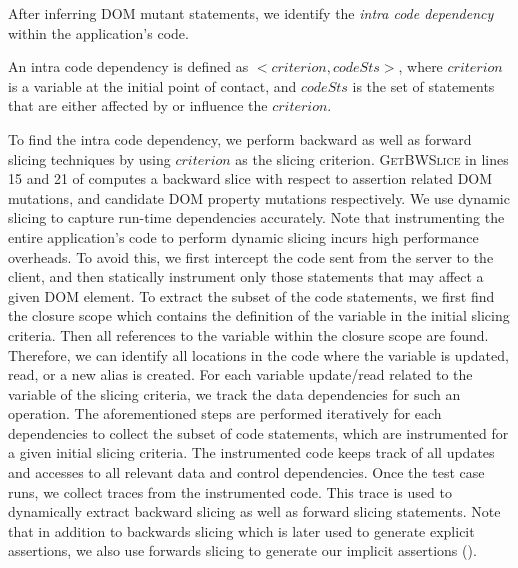 After inferring DOM mutant statements, we identify the \emph{intra code dependency} within the application's code.
\begin{mydef}
\label{def:intraCodeDep}  
An intra code dependency is defined as $<criterion, codeSts>$, where $criterion$ is a variable at the initial point of contact, and $codeSts$ is the set of statements that are either affected by or influence the $criterion$. 
\end{mydef}
To find the intra code dependency, we perform backward as well as forward slicing techniques by using $criterion$ as the slicing criterion.
\textsc{GetBWSlice} in lines  15 and 21 of  computes a backward slice with respect to assertion related DOM mutations, and candidate DOM property mutations respectively.
We use dynamic slicing to capture run-time dependencies accurately.
Note that instrumenting the entire application's code to perform dynamic slicing incurs high performance overheads. To avoid this, we first intercept the code sent from the server to the client, and then statically instrument only those statements that may affect a given DOM element.
To extract the subset of the code statements, we first find the \javascript closure scope which contains the definition of the variable in the initial slicing criteria. Then all references to the variable within the closure scope are found. Therefore, we can identify all locations in the code where the variable is updated, read, or a new alias is created. For each variable update/read related to the variable of the slicing criteria, we track the data dependencies for such an operation. The aforementioned steps are performed iteratively for each dependencies to collect the subset of code statements, which are instrumented for a given initial slicing criteria.
The instrumented code keeps track of all updates and accesses to all relevant data and control dependencies.   
Once the test case runs, we collect traces from the instrumented code. This trace is used to dynamically extract backward slicing as well as forward slicing statements. Note that in addition to backwards slicing which is later used to generate explicit assertions, we also use forwards slicing to generate our implicit assertions ().  

